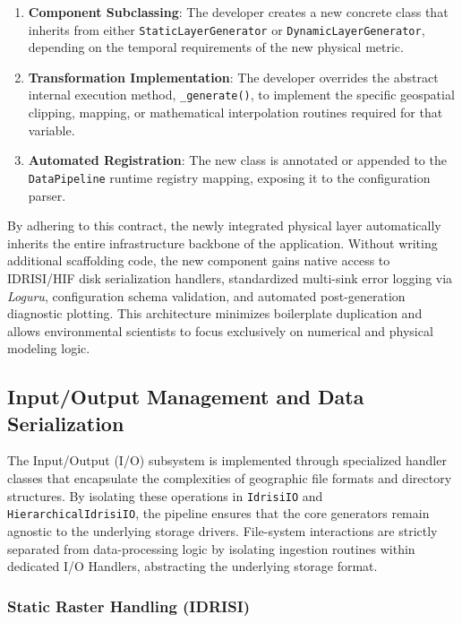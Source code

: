 \begin{enumerate}
    \item \textbf{Component Subclassing}: The developer creates a new concrete class that inherits from either \texttt{StaticLayerGenerator} 
    or \texttt{DynamicLayerGenerator}, depending on the temporal requirements of the new physical metric.

    \item \textbf{Transformation Implementation}: The developer overrides the abstract internal execution method, \texttt{\_generate()}, 
    to implement the specific geospatial clipping, mapping, or mathematical interpolation routines required for that variable.

    \item \textbf{Automated Registration}: The new class is annotated or appended to the \\ \texttt{DataPipeline} runtime registry mapping, 
    exposing it to the configuration parser.
\end{enumerate}

By adhering to this contract, the newly integrated physical layer automatically inherits the entire infrastructure backbone of the 
application. Without writing additional scaffolding code, the new component gains native access to IDRISI/HIF disk serialization handlers, 
standardized multi-sink error logging via \textsl{Loguru}, configuration schema validation, and automated post-generation diagnostic 
plotting. This architecture minimizes boilerplate duplication and allows environmental scientists to focus exclusively on numerical and 
physical modeling logic.


\subsection{Input/Output Management and Data Serialization}
\label{subsec:io_management}

The Input/Output (I/O) subsystem is implemented through specialized handler classes that encapsulate the complexities of geographic file 
formats and directory structures. By isolating these operations in \texttt{IdrisiIO} and \texttt{HierarchicalIdrisiIO}, the 
pipeline ensures that the core generators remain agnostic to the underlying storage drivers. File-system interactions are 
strictly separated from data-processing logic by isolating ingestion routines within dedicated I/O Handlers, abstracting the underlying 
storage format.


\subsubsection{Static Raster Handling (IDRISI)}

